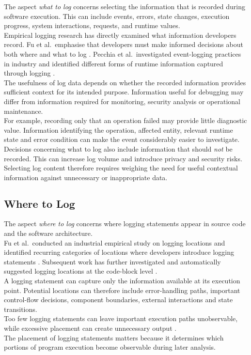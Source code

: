 The aspect \textit{what to log} concerns selecting the information that is recorded during software execution.
This can include events, errors, state changes, execution progress, system interactions, requests, and runtime values.
\\
Empirical logging research has directly examined what information developers record.
Fu et al.\ emphasise that developers must make informed decisions about both where and what to log \cite{fu2014wheredodeveloperslog}. 
Pecchia et al.\ investigated event-logging practices in industry and identified different forms of 
runtime information captured through logging \cite{peccia2015industrypracticesandeventlogging}.
\\
The usefulness of log data depends on whether the recorded information provides sufficient context for its intended purpose. 
Information useful for debugging may differ from information required for monitoring, security analysis or operational maintenance.
\\
For example, recording only that an operation failed may provide little diagnostic value. 
Information identifying the operation, affected entity, relevant runtime state and error condition 
can make the event considerably easier to investigate.
\\
Decisions concerning what to log also include information that should \textit{not} be recorded. 
This can increase log volume and introduce privacy and security risks.
\\
Selecting log content therefore requires weighing the need for useful contextual information against unnecessary or inappropriate data.

\subsection{Where to Log}
\label{subsec:where_to_log}

The aspect \textit{where to log} concerns where logging statements appear in source code and the software architecture.
\\
Fu et al.\ conducted an industrial empirical study on logging locations 
and identified recurring categories of locations where developers introduce logging statements \cite{fu2014wheredodeveloperslog}. 
Subsequent work has further investigated and automatically suggested logging locations at the code-block level \cite{li2021whereshallwelog}.
\\
A logging statement can capture only the information available at its execution point. 
Potential locations can therefore include error-handling paths, important control-flow decisions, 
component boundaries, external interactions and state transitions.
\\
Too few logging statements can leave important execution paths unobservable, 
while excessive placement can create unnecessary output \cite{li2021whereshallwelog}.
\\
The placement of logging statements matters because it determines which portions of program execution 
become observable during later analysis.

